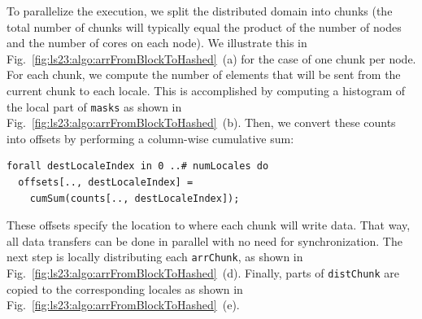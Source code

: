To parallelize the execution, we split the distributed domain into chunks (the total number of chunks will typically equal the product of the number of nodes and the number of cores on each node). We illustrate this in Fig.~\ref{fig:ls23:algo:arrFromBlockToHashed}~(a) for the case of one chunk per node. For each chunk, we compute the number of elements that will be sent from the current chunk to each locale. This is accomplished by computing a histogram of the local part of \verb|masks| as shown in Fig.~\ref{fig:ls23:algo:arrFromBlockToHashed}~(b). Then, we convert these counts into offsets by performing a column-wise cumulative sum:

\begin{verbatim}
forall destLocaleIndex in 0 ..# numLocales do
  offsets[.., destLocaleIndex] =
    cumSum(counts[.., destLocaleIndex]);
\end{verbatim}
These offsets specify the location to where each chunk will write data. That way, all data transfers can be done in parallel with no need for synchronization. The next step is locally distributing each \verb|arrChunk|, as shown in Fig.~\ref{fig:ls23:algo:arrFromBlockToHashed}~(d). Finally, parts of \verb|distChunk| are copied to the corresponding locales as shown in Fig.~\ref{fig:ls23:algo:arrFromBlockToHashed}~(e).


